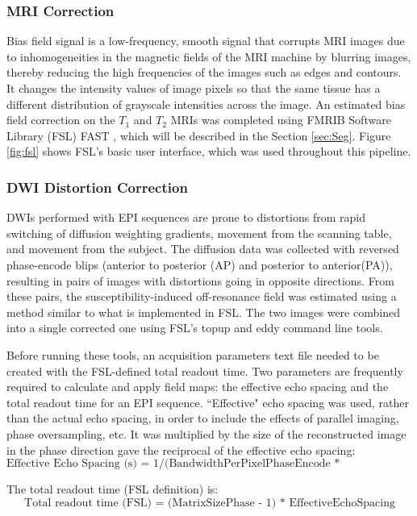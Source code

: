\subsubsection{MRI Correction}

Bias field signal is a low-frequency, smooth signal that corrupts MRI images due to inhomogeneities in the magnetic fields of the MRI machine by blurring images, thereby reducing the high frequencies of the images such as edges and contours. It changes the intensity values of image pixels so that the same tissue has a different distribution of grayscale intensities across the image. \cite{ref:bias} An estimated bias field correction on the $T_1$ and $T_2$ MRIs was completed using FMRIB Software Library (FSL) FAST \cite{ref:fslfast}, which will be described in the Section \ref{sec:Seg}. Figure \ref{fig:fsl} shows FSL's basic user interface, which was used throughout this pipeline. 

\subsubsection{DWI Distortion Correction}

DWIs performed with EPI sequences are prone to distortions from rapid switching of diffusion weighting gradients, movement from the scanning table, and movement from the subject. The diffusion data was collected with reversed phase-encode blips (anterior to posterior (AP) and posterior to anterior(PA)), resulting in pairs of images with distortions going in opposite directions. From these pairs, the susceptibility-induced off-resonance field was estimated using a method \cite{ref:fsltopup1} similar to what is implemented in FSL.\cite{ref:fsltopup2} The two images were combined into a single corrected one using FSL's topup and eddy command line tools.

Before running these tools, an acquisition parameters text file needed to be created with the FSL-defined total readout time. Two parameters are frequently required to calculate and apply field maps: the effective echo spacing and the total readout time for an EPI sequence. ``Effective" echo spacing was used, rather than the actual echo spacing, in order to include the effects of parallel imaging, phase oversampling, etc. It was multiplied by the size of the reconstructed image in the phase direction gave the reciprocal of the effective echo spacing:
\[
\text{Effective Echo Spacing (s) = 1/(BandwidthPerPixelPhaseEncode * MatrixSizePhase)}
\]

The total readout time (FSL definition) is:
\[
\text{Total readout time (FSL) = (MatrixSizePhase - 1) * EffectiveEchoSpacing}
\]

